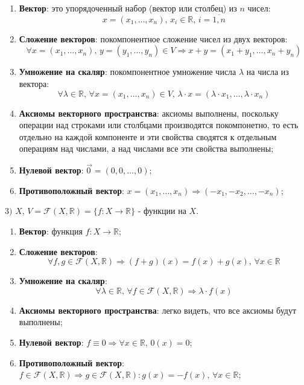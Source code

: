 \documentclass[12pt]{article}
\newcommand{\MR}{\mathbb{R}}
\newcommand{\MF}{\mathcal{F}}
\theoremstyle{definition}
\newcommand{\vecm}[1]{\overrightarrow{#1\,}}
\begin{document}
\begin{enumerate}[label=(\arabic*)]
	\item \textbf{Вектор}: это упорядоченный набор (вектор или столбец) из $n$ чисел: 
	$$
		x = (x_1,\dotsc, x_n), \, x_i \in \MR, \, i = \overline{1,n}
	$$
	\item \textbf{Сложение векторов}: покомпонентное сложение чисел из двух векторов:
	$$
		\forall x = (x_1,\dotsc,x_n), \, y = (y_1,\dotsc, y_n) \in V \Rightarrow x + y = (x_1 + y_1, \dotsc, x_n + y_n)
	$$
	\item \textbf{Умножение на скаляр}: покомпонентное умножение числа $\lambda$ на числа из вектора:
	$$
		\forall \lambda \in \MR, \, \forall x = (x_1,\dotsc,x_n) \in V, \, \lambda{\cdot}x = (\lambda{\cdot}x_1, \dotsc, \lambda{\cdot}x_n)
	$$
	\item \textbf{Аксиомы векторного пространства}: аксиомы выполнены, поскольку операции над строками или столбцами производятся покомпонетно, то есть отдельно на каждой компоненте и эти свойства сводятся к отдельным операциям над числами, а над числами все эти свойства выполнены;
	
	\item \textbf{Нулевой вектор}: $\vecm{0} = (0, 0 ,\dotsc,0)$;
	
	\item \textbf{Противоположный вектор}: $x = (x_1,\dotsc,x_n) \Rightarrow (-x_1,-x_2, \dotsc, -x_n)$;
\end{enumerate}


$3)$  $X$, $V = \MF(X,\MR) =\{f \colon X \to \MR \}$ - функции на $X$.

\begin{enumerate}[label=(\arabic*)]
	\item \textbf{Вектор}: функция $f \colon X \to \MR$;
	
	\item \textbf{Сложение векторов}: 
	$$
		\forall f,g \in \MF(X,\MR) \Rightarrow (f+g)(x) = f(x) + g(x), \, \forall x \in \MR
	$$
	
	\item \textbf{Умножение на скаляр}: 
	$$
		\forall \lambda \in \MR, \, \forall f \in \MF(X,\MR) \Rightarrow \lambda{\cdot}f(x)
	$$
	
	\item \textbf{Аксиомы векторного пространства}: легко видеть, что все аксиомы будут выполнены;
	
	\item \textbf{Нулевой вектор}: $f \equiv 0 \Rightarrow \forall x \in \MR, \, 0(x) = 0$;
	
	\item \textbf{Противоположный вектор}: $f \in \MF(X,\MR) \Rightarrow g \in \MF(X,\MR) \colon g(x) = -f(x), \, \forall x \in \MR$;
\end{enumerate}
\end{document}
